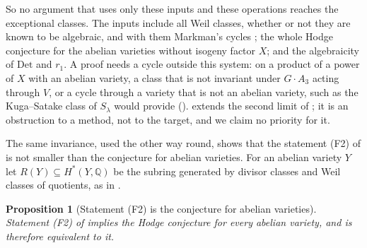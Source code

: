 \documentclass[11pt,reqno]{amsart}
\theoremstyle{plain}
\newtheorem{proposition}[theorem]{Proposition}
\theoremstyle{definition}
\theoremstyle{remark}
\newcommand{\QQ}{\mathbb{Q}}
\begin{document}
So no argument that uses only these inputs and these operations reaches the
exceptional classes. The inputs include all Weil classes, whether or not they
are known to be algebraic, and with them Markman's cycles \cite{Mar25a}; the
whole Hodge conjecture for the abelian varieties without isogeny factor $X$;
and the algebraicity of $\mathrm{Det}$ and $r_{1}$. A proof needs a cycle
outside this system: on a product of a power of $X$ with an abelian variety, a
class that is not invariant under $G\cdot A_{3}$ acting through $V$, or a cycle
through a variety that is not an abelian variety, such as the Kuga--Satake
class of $S_{\lambda}$ would provide ().
 extends the second limit of
; it is an obstruction to a method, not to the
target, and we claim no priority for it.

The same invariance, used the other way round, shows that the statement (F2)
of  is not smaller than the conjecture for abelian
varieties. For an abelian variety $Y$ let $R(Y)\subseteq H^{*}(Y,\QQ)$ be the
subring generated by divisor classes and Weil classes of quotients, as in
.

\begin{proposition}[Statement (F2) is the conjecture for abelian varieties]
\label{prop:f2isab}
Statement \textup{(F2)} of  implies the Hodge
conjecture for every abelian variety, and is therefore equivalent to it.
\end{proposition}
\end{document}
